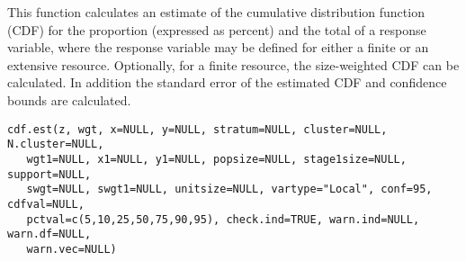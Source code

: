 \begin{Description}\relax
This function calculates an estimate of the cumulative distribution function
(CDF) for the proportion (expressed as percent) and the total of a response
variable, where the response variable may be defined for either a finite
or an extensive resource.  Optionally, for a finite resource, the
size-weighted CDF can be calculated.  In addition the standard error of the
estimated CDF and confidence bounds are calculated.
\end{Description}
\begin{Usage}
\begin{verbatim}
cdf.est(z, wgt, x=NULL, y=NULL, stratum=NULL, cluster=NULL, N.cluster=NULL,
   wgt1=NULL, x1=NULL, y1=NULL, popsize=NULL, stage1size=NULL, support=NULL,
   swgt=NULL, swgt1=NULL, unitsize=NULL, vartype="Local", conf=95, cdfval=NULL,
   pctval=c(5,10,25,50,75,90,95), check.ind=TRUE, warn.ind=NULL, warn.df=NULL,
   warn.vec=NULL)
\end{verbatim}
\end{Usage}
